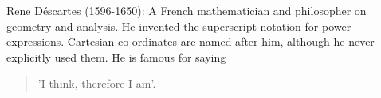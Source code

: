 Rene D\'escartes (1596-1650):
  A French mathematician and philosopher on geometry and analysis. He
  invented the superscript notation for power expressions. Cartesian
  co-ordinates are named after him, although he never explicitly used
  them. He is famous for saying 
  \begin{quotation}
    'I think, therefore I am'.
  \end{quotation}
